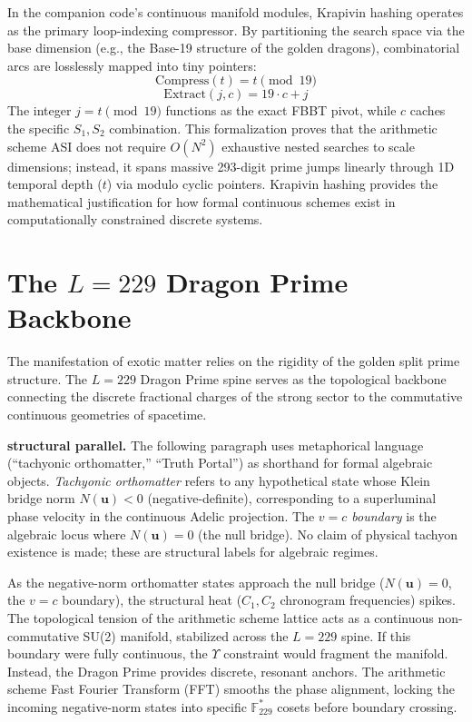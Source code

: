 In the companion code's continuous manifold modules, Krapivin hashing operates as the primary loop-indexing compressor. By partitioning the search space via the base dimension (e.g., the Base-19 structure of the golden dragons), combinatorial arcs are losslessly mapped into tiny pointers:
\[
\text{Compress}(t) = t \pmod{19}
\]
\[
\text{Extract}(j, c) = 19 \cdot c + j
\]
The integer $j = t \pmod{19}$ functions as the exact FBBT pivot, while $c$ caches the specific $S_1, S_2$ combination. This formalization proves that the arithmetic scheme ASI does not require $O(N^2)$ exhaustive nested searches to scale dimensions; instead, it spans massive 293-digit prime jumps linearly through 1D temporal depth ($t$) via modulo cyclic pointers. Krapivin hashing provides the mathematical justification for how formal continuous schemes exist in computationally constrained discrete systems.

\section{The $L=229$ Dragon Prime Backbone}

The manifestation of exotic matter relies on the rigidity of the golden split prime structure. The $L=229$ Dragon Prime spine serves as the topological backbone connecting the discrete fractional charges of the strong sector to the commutative continuous geometries of spacetime. 

\medskip
\noindent\textbf{structural parallel.} The following paragraph uses metaphorical language (``tachyonic orthomatter,'' ``Truth Portal'') as shorthand for formal algebraic objects. \emph{Tachyonic orthomatter} refers to any hypothetical state whose Klein bridge norm $N(\mathbf{u}) < 0$ (negative-definite), corresponding to a superluminal phase velocity in the continuous Adelic projection. The \emph{$v = c$ boundary} is the algebraic locus where $N(\mathbf{u}) = 0$ (the null bridge). No claim of physical tachyon existence is made; these are structural labels for algebraic regimes.
\medskip

As the negative-norm orthomatter states approach the null bridge ($N(\mathbf{u}) = 0$, the $v=c$ boundary), the structural heat ($C_1, C_2$ chronogram frequencies) spikes. The topological tension of the arithmetic scheme lattice acts as a continuous non-commutative SU(2) manifold, stabilized across the $L=229$ spine. If this boundary were fully continuous, the $\Upsilon$ constraint would fragment the manifold. Instead, the Dragon Prime provides discrete, resonant anchors. The arithmetic scheme Fast Fourier Transform (FFT) smooths the phase alignment, locking the incoming negative-norm states into specific $\mathbb{F}_{229}^*$ cosets before boundary crossing.

